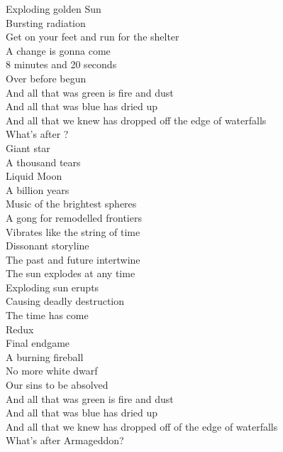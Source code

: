 


Exploding golden Sun\\
Bursting radiation\\
Get on your feet and run for the shelter\\
A change is gonna come\\
8 minutes and 20 seconds\\
Over before begun\\

And all that was green is fire and dust\\
And all that was blue has dried up\\
And all that we knew has dropped off the edge of waterfalls\\
What's after ?\\

Giant star\\
A thousand tears\\
Liquid Moon\\
A billion years\\
Music of the brightest spheres\\
A gong for remodelled frontiers\\
Vibrates like the string of time\\
Dissonant storyline\\
The past and future intertwine\\
The sun explodes at any time\\

Exploding sun erupts\\
Causing deadly destruction\\
The time has come\\
Redux\\
Final endgame\\
A burning fireball\\
No more white dwarf\\
Our sins to be absolved\\

And all that was green is fire and dust\\
And all that was blue has dried up\\
And all that we knew has dropped off of the edge of waterfalls\\
What's after Armageddon?\\

